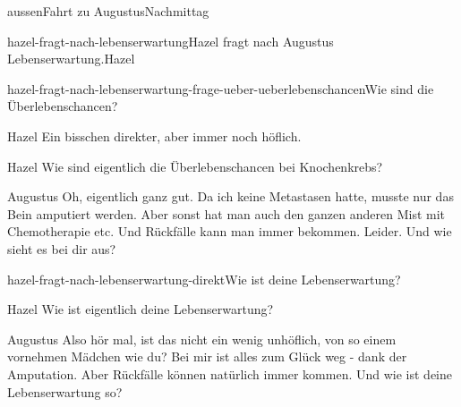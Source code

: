 \documentclass[12pt]{article}
\begin{document}
\begin{scene}{aussen}{Fahrt zu Augustus}{Nachmittag}
\begin{decision}{hazel-fragt-nach-lebenserwartung}{\gls{Hazel} fragt nach \gls{Augustus} Lebenserwartung.}{Hazel}
            \begin{option}{hazel-fragt-nach-lebenserwartung-frage-ueber-ueberlebenschancen}{Wie sind die Überlebenschancen?}
                \begin{dialog}[In Gedanken]{Hazel}
                    Ein bisschen direkter, aber immer noch höflich.
                \end{dialog}

                \begin{dialog}{Hazel}
                    Wie sind eigentlich die Überlebenschancen bei Knochenkrebs?
                \end{dialog}

                \begin{dialog}{Augustus}
                    Oh, eigentlich ganz gut.
                    Da ich keine Metastasen hatte, musste nur das Bein amputiert werden.
                    Aber sonst hat man auch den ganzen anderen Mist mit Chemotherapie etc.
                    Und Rückfälle kann man immer bekommen.
                    Leider.
                    \pause
                    Und wie sieht es bei dir aus?
                \end{dialog}
            \end{option}

            \begin{option}{hazel-fragt-nach-lebenserwartung-direkt}{Wie ist deine Lebenserwartung?}
                \begin{dialog}{Hazel}
                    Wie ist eigentlich deine Lebenserwartung?
                \end{dialog}

                \begin{dialog}[verärgert]{Augustus}
                    Also hör mal, ist das nicht ein wenig unhöflich, von so einem vornehmen Mädchen wie du?
                    Bei mir ist alles zum Glück weg - dank der Amputation.
                    Aber Rückfälle können natürlich immer kommen.
                    Und wie ist deine Lebenserwartung so?
                \end{dialog}
            \end{option}
        \end{decision}


\end{scene}
\end{document}
